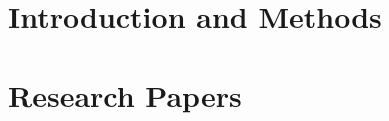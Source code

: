 \documentclass[10pt,twoside,openright]{memoir}
\begin{document}



\frontmatter
\setcounter{page}{3}
% 

\cleardoublepage

% 
\cleardoublepage
\tableofcontents
\cleardoublepage
\listoffigures
\cleardoublepage
\listoftables
\cleardoublepage


\mainmatter
\part[Part I]{Introduction and Methods}
\pagestyle{ruled}










\appendix
\backmatter
\printbibliography[title=References]

\makeatletter
\def\pagenumbering#1{%
  \gdef\thepage{\csname @#1\endcsname \c@page}}
\makeatother

\mainmatter
\part[Part II]{Research Papers}
\pagenumbering{gobble}
\pagestyle{cleared}

\end{document}
